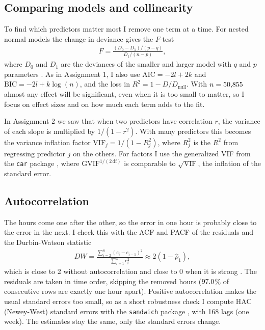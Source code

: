 \documentclass[12pt]{article}
\begin{document}
\subsection{Comparing models and collinearity}

To find which predictors matter most I remove one term at a time. For nested normal models the change in deviance gives the $F$-test
\begin{align*}
F = \frac{(D_0 - D_1)/(p - q)}{D_1/(n - p)},
\end{align*}
where $D_0$ and $D_1$ are the deviances of the smaller and larger model with $q$ and $p$ parameters \parencite{dobson2008glm}. As in Assignment 1, I also use $\text{AIC} = -2l + 2k$ and $\text{BIC} = -2l + k\log(n)$, and the loss in $R^2 = 1 - D/D_{\text{null}}$. With $n = 50{,}855$ almost any effect will be significant, even when it is too small to matter, so I focus on effect sizes and on how much each term adds to the fit.

In Assignment 2 we saw that when two predictors have correlation $r$, the variance of each slope is multiplied by $1/(1-r^2)$. With many predictors this becomes the variance inflation factor $\text{VIF}_j = 1/(1 - R_j^2)$, where $R_j^2$ is the $R^2$ from regressing predictor $j$ on the others. For factors I use the generalized VIF from the \texttt{car} package \parencite{car}, where $\text{GVIF}^{1/(2\,\text{df})}$ is comparable to $\sqrt{\text{VIF}}$, the inflation of the standard error.

\subsection{Autocorrelation}

The hours come one after the other, so the error in one hour is probably close to the error in the next. I check this with the ACF and PACF of the residuals and the Durbin-Watson statistic
\begin{align*}
DW = \frac{\sum_{i=2}^{n}(e_i - e_{i-1})^2}{\sum_{i=1}^{n}e_i^2} \approx 2(1 - \hat\rho_1),
\end{align*}
which is close to 2 without autocorrelation and close to 0 when it is strong \parencite{lmtest}. The residuals are taken in time order, skipping the removed hours ($97.0$\% of consecutive rows are exactly one hour apart). Positive autocorrelation makes the usual standard errors too small, so as a short robustness check I compute HAC (Newey-West) standard errors with the \texttt{sandwich} package \parencite{sandwich}, with 168 lags (one week). The estimates stay the same, only the standard errors change.
\end{document}

